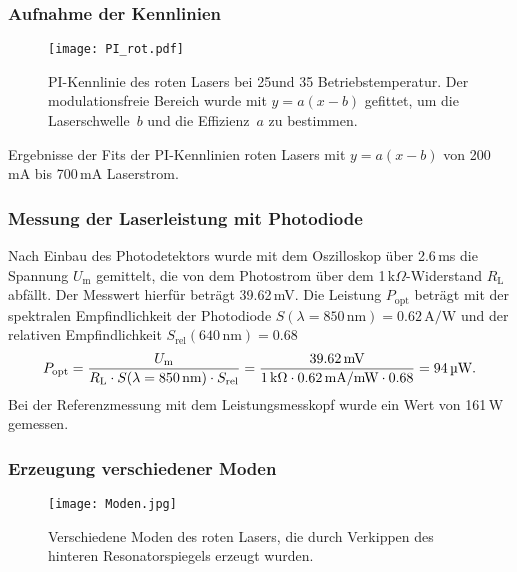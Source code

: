 \subsubsection{Aufnahme der Kennlinien}


\begin{figure}[H]
\begin{center}
  \texttt{[image: PI\_rot.pdf]}
  \caption{PI-Kennlinie des roten Lasers bei 25\grad und 35\grad
  Betriebstemperatur. Der modulationsfreie Bereich wurde mit $y=a(x-b)$
  gefittet, um die Laserschwelle~$b$ und die Effizienz~$a$ zu bestimmen.}
  \label{img:PI_rot}
\end{center}
\end{figure}


\begin{table}[htb]
\caption{Ergebnisse der Fits der PI-Kennlinien roten Lasers mit $y=a(x-b)$ von 200\,mA bis
700\,mA Laserstrom.}

\label{tab:Fits_PI_rot}
\end{table}

\FloatBarrier

\subsubsection{Messung der Laserleistung mit Photodiode}

Nach Einbau des Photodetektors wurde mit dem Oszilloskop über 2.6\,ms die Spannung $U_\text{m}$
gemittelt, die von dem Photostrom über dem 1\,k$\Omega$-Widerstand $R_\text{L}$ abfällt.
Der Messwert hierfür beträgt 39.62\,mV.
Die Leistung $P_{\text{opt}}$ beträgt mit der spektralen Empfindlichkeit der Photodiode $S(\lambda
= 850\,\text{nm}) = 0.62\,\text{A/W}$ und der relativen Empfindlichkeit
$S_\text{rel}(640\,\text{nm}) = 0.68$ \cite{Versuchsanleitung}
\begin{equation*}
P_{\text{opt}} = \frac{U_\text{m}}{R_\text{L} \cdot S(\lambda = 850\,\text{nm}) \cdot S_\text{rel}}=
\frac{39.62\,\text{mV}}{1\,\text{k}\Omega \cdot 0.62\,\text{mA/mW} \cdot 0.68}=
94\,\text{\textmu W}.
\label{eq:pphot}
\end{equation*}
Bei der Referenzmessung mit dem Leistungsmesskopf wurde ein Wert von 161\,\textmu W gemessen.


\subsubsection{Erzeugung verschiedener Moden}

\begin{figure}[H]
\begin{center}
  \texttt{[image: Moden.jpg]}
  \caption{Verschiedene Moden des roten Lasers, die durch Verkippen des hinteren Resonatorspiegels
  erzeugt wurden.}
  \label{img:moden}
\end{center}
\end{figure}

